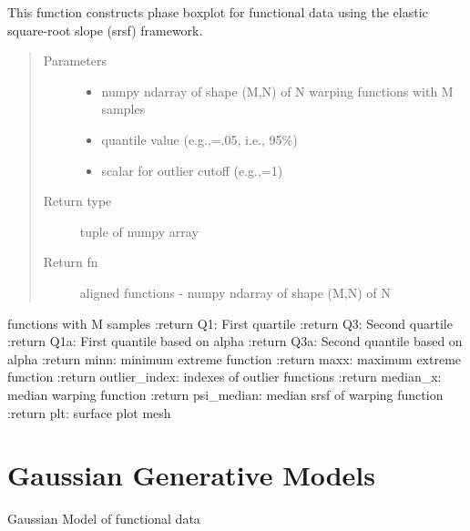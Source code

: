 \documentclass[letterpaper,10pt,english]{sphinxmanual}
\begin{document}
\begin{fulllineitems}
\label{\detokenize{boxplots:boxplots.phbox}}
This function constructs phase boxplot for functional data using the elastic
square-root slope (srsf) framework.
\begin{quote}\begin{description}
\item[{Parameters}] \leavevmode\begin{itemize}
\item {} 
 \textendash{} numpy ndarray of shape (M,N) of N warping functions with M samples

\item {} 
 \textendash{} quantile value (e.g.,=.05, i.e., 95\%)

\item {} 
 \textendash{} scalar for outlier cutoff (e.g.,=1)

\end{itemize}

\item[{Return type}] \leavevmode
tuple of numpy array

\item[{Return fn}] \leavevmode
aligned functions - numpy ndarray of shape (M,N) of N

\end{description}\end{quote}

functions with M samples
:return Q1: First quartile
:return Q3: Second quartile
:return Q1a: First quantile based on alpha
:return Q3a: Second quantile based on alpha
:return minn: minimum extreme function
:return maxx: maximum extreme function
:return outlier\_index: indexes of outlier functions
:return median\_x: median warping function
:return psi\_median: median srsf of warping function
:return plt: surface plot mesh

\end{fulllineitems}



\chapter{Gaussian Generative Models}
\label{\detokenize{gauss_model:module-gauss_model}}\label{\detokenize{gauss_model:gaussian-generative-models}}\label{\detokenize{gauss_model::doc}}
Gaussian Model of functional data
\end{document}
